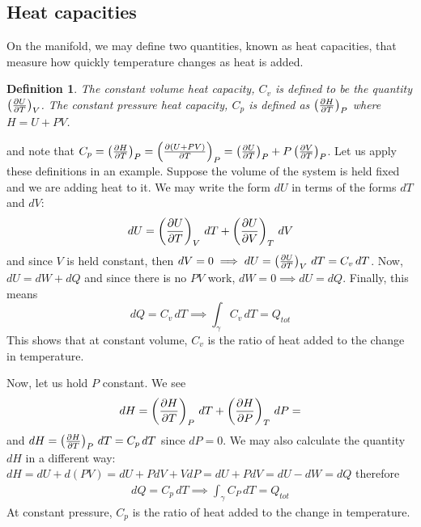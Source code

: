 \documentclass[12pt]{article}
\newtheorem{definition}{Definition}
\begin{document}
\subsection{Heat capacities}
On the manifold, we may define two quantities, known as heat capacities, that measure how quickly temperature changes as heat is added.
\begin{definition}
The constant volume heat capacity, $C_v$ is defined to be the quantity $\left(\frac{\partial U}{\partial T}\right)_{V}$. The constant pressure heat capacity, $C_p$ is defined as $\left(\frac{\partial H}{\partial T}\right)_{P}$ where $H = U+PV$.
\end{definition} and note that $C_p = \left(\frac{\partial H}{\partial T}\right)_{P} = \left(\frac{\partial (U + PV)}{\partial T}\right)_{P}= \left(\frac{\partial U}{\partial T}\right)_P + P \left(\frac{\partial V}{\partial T}\right)_P$. Let us apply these definitions in an example. Suppose the volume of the system is held fixed and we are adding heat to it. We may write the form $dU$ in terms of the forms $dT$ and $dV$:
\begin{gather}
    dU = \left(\frac{\partial U}{\partial T}\right)_{V}\, dT + \left(\frac{\partial U}{\partial V}\right)_{T}\, dV
\end{gather} and since $V$ is held constant, then $dV = 0 \implies dU = \left(\frac{\partial U}{\partial T}\right)_{V}\, dT = C_v\, dT$. Now, $dU = dW + dQ$ and since there is no $PV$ work, $dW = 0 \implies dU = dQ$. Finally, this means
\begin{equation}
    dQ = C_v\, dT \implies \int_{\gamma}{C_v \, dT} = Q_{tot}
\end{equation}
This shows that at constant volume, $C_v$ is the ratio of heat added to the change in temperature.\par
Now, let us hold $P$ constant. We see 
\begin{gather}
    dH = \left(\frac{\partial H}{\partial T}\right)_{P}\, dT + \left(\frac{\partial H}{\partial P}\right)_{T}\, dP = 
\end{gather}
and $dH = \left(\frac{\partial H}{\partial T}\right)_{P}\, dT = C_p\, dT$ since $dP = 0$. We may also calculate the quantity $dH$ in a different way: $dH = dU + d(PV) = dU + P dV + V dP = dU + P dV = dU - dW = dQ$ therefore 
\begin{gather}
    dQ = C_p\, dT \implies \int_{\gamma}{C_P\, dT} = Q_{tot}
\end{gather}
At constant pressure, $C_p$ is the ratio of heat added to the change in temperature.
\end{document}
